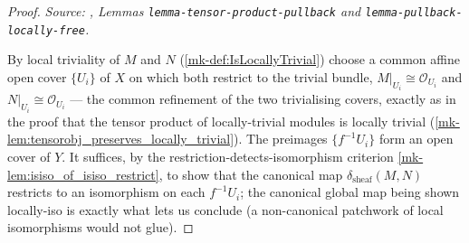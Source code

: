 \begin{proof}
  \textit{Source: \cite{stacks-project}, Lemmas \texttt{lemma-tensor-product-pullback} and
  \texttt{lemma-pullback-locally-free}.}

  By local triviality of \(M\) and \(N\) (\ref{mk-def:IsLocallyTrivial}) choose a common
  affine open cover \(\{U_i\}\) of \(X\) on which both restrict to the trivial bundle,
  \(M|_{U_i} \cong \mathcal{O}_{U_i}\) and \(N|_{U_i} \cong \mathcal{O}_{U_i}\) --- the
  common refinement of the two trivialising covers, exactly as in the proof that the
  tensor product of locally-trivial modules is locally trivial
  (\ref{mk-lem:tensorobj_preserves_locally_trivial}). The preimages
  \(\{f^{-1}U_i\}\) form an open cover of \(Y\). It suffices, by the
  restriction-detects-isomorphism criterion \ref{mk-lem:isiso_of_isiso_restrict}, to show
  that the canonical map \(\delta_{\mathrm{sheaf}}(M,N)\) restricts to an isomorphism on
  each \(f^{-1}U_i\); the canonical global map being shown locally-iso is exactly what
  lets us conclude (a non-canonical patchwork of local isomorphisms would not glue).


\end{proof}
